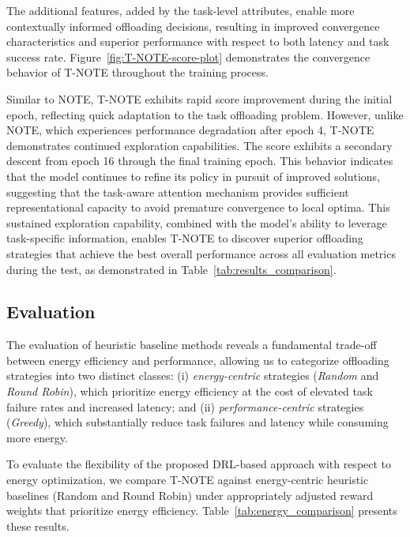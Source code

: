 \documentclass{svproc}
\begin{document}
The additional features, added by the task-level attributes, enable more contextually informed offloading decisions, resulting in improved convergence characteristics and superior performance with respect to both latency and task success rate. Figure~\ref{fig:T-NOTE-score-plot} demonstrates the convergence behavior of T-NOTE throughout the training process.


Similar to NOTE, T-NOTE exhibits rapid score improvement during the initial epoch, reflecting quick adaptation to the task offloading problem. However, unlike NOTE, which experiences performance degradation after epoch 4, T-NOTE demonstrates continued exploration capabilities. The score exhibits a secondary descent from epoch 16 through the final training epoch. This behavior indicates that the model continues to refine its policy in pursuit of improved solutions, suggesting that the task-aware attention mechanism provides sufficient representational capacity to avoid premature convergence to local optima. This sustained exploration capability, combined with the model's ability to leverage task-specific information, enables T-NOTE to discover superior offloading strategies that achieve the best overall performance across all evaluation metrics during the test, as demonstrated in Table~\ref{tab:results_comparison}.
\subsection{Evaluation}

The evaluation of heuristic baseline methods reveals a fundamental trade-off between energy efficiency and performance, allowing us to categorize offloading strategies into two distinct classes: (i) \emph{energy-centric} strategies (\emph{Random} and \emph{Round Robin}), which prioritize energy efficiency at the cost of elevated task failure rates and increased latency; and (ii) \emph{performance-centric} strategies (\emph{Greedy}), which substantially reduce task failures and latency while consuming more energy.


To evaluate the flexibility of the proposed DRL-based approach with respect to energy optimization, we compare T-NOTE against energy-centric heuristic baselines (Random and Round Robin) under appropriately adjusted reward weights that prioritize energy efficiency. Table~\ref{tab:energy_comparison} presents these results.
\end{document}
